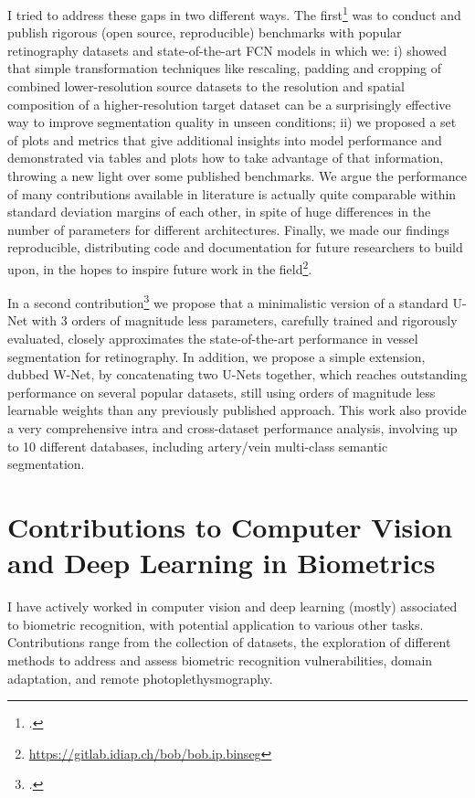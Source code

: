 \documentclass[a4paper,10pt,onecolumn]{article}
\begin{document}
I tried to address these gaps in two different ways.  The
first\footcite{arxiv-2019} was to conduct and publish rigorous (open source,
reproducible) benchmarks with popular retinography datasets and
state-of-the-art FCN models in which we: i) showed that simple transformation
techniques like rescaling, padding and cropping of combined lower-resolution
source datasets to the resolution and spatial composition of a
higher-resolution target dataset can be a surprisingly effective way to improve
segmentation quality in unseen conditions; ii) we proposed a set of plots and
metrics that give additional insights into model performance and demonstrated
via tables and plots how to take advantage of that information, throwing a new
light over some published benchmarks.  We argue the performance of many
contributions available in literature is actually quite comparable within
standard deviation margins of each other, in spite of huge differences in the
number of parameters for different architectures.  Finally, we made our
findings reproducible, distributing code and documentation for future
researchers to build upon, in the hopes to inspire future work in the
field\footnote{\url{https://gitlab.idiap.ch/bob/bob.ip.binseg}}.

In a second contribution\footcite{nsr-2022} we propose that a minimalistic
version of a standard U-Net with 3 orders of magnitude less parameters,
carefully trained and rigorously evaluated, closely approximates the
state-of-the-art performance in vessel segmentation for retinography.  In
addition, we propose a simple extension, dubbed W-Net, by concatenating two
U-Nets together, which reaches outstanding performance on several popular
datasets, still using orders of magnitude less learnable weights than any
previously published approach.  This work also provide a very comprehensive
intra and cross-dataset performance analysis, involving up to 10 different
databases, including artery/vein multi-class semantic segmentation.

\section{Contributions to Computer Vision and Deep Learning in Biometrics}

I have actively worked in computer vision and deep learning (mostly) associated
to biometric recognition, with potential application to various other tasks.
Contributions range from the collection of datasets, the exploration of
different methods to address and assess biometric recognition vulnerabilities,
domain adaptation, and remote photoplethysmography.
\end{document}
